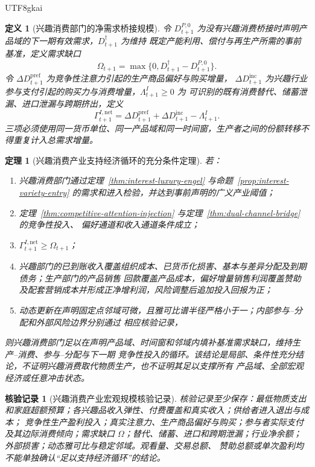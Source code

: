 \documentclass[12pt,a4paper,openany]{report}
\newtheorem{definition}{定义}[chapter]
\newtheorem{theorem}{定理}[chapter]
\newtheorem{Certificate}{核验记录}[chapter]
\begin{document}
\begin{CJK*}{UTF8}{gkai}
\begin{definition}[兴趣消费部门的净需求桥接规模]
令 \(D_{t+1}^{P,0}\) 为没有兴趣消费桥接时声明产品域的下一期有效需求，\(D_{t+1}^{\dagger}\) 为维持
既定产能利用、偿付与再生产所需的事前基准，定义需求缺口
\[
  \Omega_{t+1}
  =\max\{0,D_{t+1}^{\dagger}-D_{t+1}^{P,0}\}.
\]
令 \(\Delta D_{t+1}^{\mathrm{pref}}\) 为竞争性注意力引起的生产商品偏好与购买增量，
\(\Delta D_{t+1}^{\mathrm{inc}}\) 为兴趣行业参与支付引起的购买力与消费增量，\(\Lambda_{t+1}^{I}\ge0\) 为
可识别的既有消费替代、储蓄泄漏、进口泄漏与跨期挤出，定义
\[
  \Gamma_{t+1}^{I,\mathrm{net}}
  =\Delta D_{t+1}^{\mathrm{pref}}
  +\Delta D_{t+1}^{\mathrm{inc}}
  -\Lambda_{t+1}^{I}.
\]
三项必须使用同一货币单位、同一产品域和同一时间窗，生产者之间的份额转移不得重复计入总需求增量。
\end{definition}

\begin{theorem}[兴趣消费产业支持经济循环的充分条件定理]
\label{thm:interest-sector-macro-support}
若：
\begin{enumerate}[label=\textup{(L\arabic*)},leftmargin=4em]
  \item 兴趣消费部门通过定理~\ref{thm:interest-luxury-engel} 与命题~\ref{prop:interest-variety-entry}
  的需求和进入检验，并达到事前声明的广义产业阈值；
  \item 定理~\ref{thm:competitive-attention-injection} 与定理~\ref{thm:dual-channel-bridge} 的竞争性投入、
  偏好通道和收入通道条件成立；
  \item \(\Gamma_{t+1}^{I,\mathrm{net}}\ge\Omega_{t+1}\)；
  \item 兴趣部门的已到账收入覆盖组织成本、已货币化损害、基本与差异分配及到期债务；生产部门的产品销售
  回款覆盖产品成本，偏好增量销售利润覆盖赞助及配套营销成本并形成正净增利润，风险调整后追加投入回报为正；
  \item 动态更新在声明固定点邻域可微，且雅可比谱半径严格小于一；内部参与--分配和外部风险边界分别通过
  相应核验记录，
\end{enumerate}
则兴趣消费部门足以在声明产品域、时间窗和邻域内填补基准需求缺口，维持生产--消费、参与--分配与下一期
竞争性投入的循环。该结论是局部、条件性充分结论，不证明兴趣消费取代物质生产，也不证明其足以支撑所有
产品域、全部宏观经济或任意冲击状态。
\end{theorem}

\begin{Certificate}[兴趣消费产业宏观规模核验记录]
核验记录至少保存：最低物质支出和家庭超额预算；各兴趣品收入弹性、付费覆盖和真实收入；供给者进入退出与成本；
竞争性生产盈利投入；真实注意力、生产商品偏好与购买；参与者实际支付及其边际消费倾向；需求缺口
\(\Omega\)；替代、储蓄、进口和跨期泄漏；行业净余额；外部损害；动态雅可比与稳定邻域。观看量、交易总额、
赞助总额或单次盈利均不能单独确认“足以支持经济循环”的结论。
\end{Certificate}


\end{CJK*}
\end{document}
